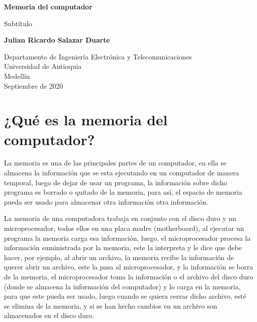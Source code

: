 \documentclass{article}
\begin{document}
\begin{titlepage}
    \begin{center}
        \vspace*{1cm}
            
        \Huge
        \textbf{Memoria del computador}
            
        \vspace{0.5cm}
        \LARGE
        Subtítulo
            
        \vspace{1.5cm}
            
        \textbf{Julian Ricardo Salazar Duarte}
            
        \vfill
            
        \vspace{0.8cm}
            
        \Large
        Departamento de Ingeniería Electrónica y Telecomunicaciones\\
        Universidad de Antioquia\\
        Medellín\\
        Septiembre de 2020
            
    \end{center}
\end{titlepage}

\tableofcontents

\section{¿Qué es la memoria del computador?}
La memoria es una de las principales partes de un computador, en ella se almacena la información que se esta ejecutando en un computador de manera temporal, luego de dejar de usar un programa, la información sobre dicho programa es borrado o quitado de la memoria, para así, el espacio de memoria pueda ser usado para almacenar otra información otra información.
\vspace{2pt}

La memoria de una computadora trabaja en conjunto con el disco duro y un microprocesador, todos ellos en una placa madre (motherboard), al ejecutar un programa la memoria carga esa información, luego, el microprocesador procesa la información suministrada por la memoria, este la interpreta y le dice que debe hacer, por ejemplo, al abrir un archivo, la memoria recibe la información de querer abrir un archivo, este la pasa al microprocesador, y la información se borra de la memoria, el microprocesador toma la información o el archivo del disco duro (donde se almacena la información del computador) y lo carga en la memoria, para que este pueda ser usado, luego cuando se quiera cerrar dicho archivo, esté se elimina de la memoria, y si se han hecho cambios en un archivo son almacenados en el disco duro.
\end{document}
